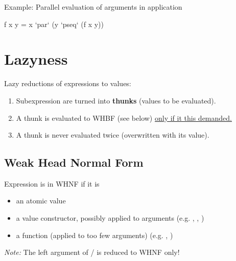 Example: Parallel evaluation of arguments in application\\
\begin{codebox}[haskell]
f x y = 
    x `par` (y `pseq` (f x y))
\end{codebox}



\section{Lazyness}


Lazy reductions of expressions to values:

\begin{enumerate}
    \item Subexpression are turned into \textbf{thunks} (values to be evaluated).
    \item A thunk is evaluated to WHBF (see below) \underline{only if it this demanded.}
    \item A thunk is never evaluated twice (overwritten with its value).
\end{enumerate}

\subsection{Weak Head Normal Form}

Expression  is in WHNF if it is
\begin{itemize}
    \item an atomic value
    \item a value constructor, possibly applied to arguments (e.g. , \codeline{\_:\_}, \codeline{(\_,\_)})
    \item a function (applied to too few arguments) (e.g. \codeline{\_ + \_}, )
\end{itemize}


\textit{Note:} The left argument of / is reduced to WHNF only!




